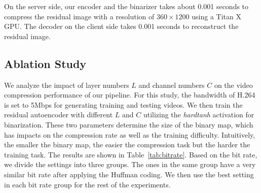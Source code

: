 \documentclass[letterpaper]{article} %
\begin{document}
	{} On the server side, our encoder and the binarizer takes about 0.001 seconds to compress the residual image with a resolution of $360 \times 1200$ using a Titan X GPU. The decoder on the client side takes 0.001 seconds to reconstruct the residual image. %

	\subsection{Ablation Study}

	{} We analyze the impact of layer numbers $L$ and channel numbers $C$ on the video compression performance of our pipeline. For this study, the bandwidth of H.264 is set to 5Mbps for generating training and testing videos. We then train the residual autoencoder with different $L$ and $C$ utilizing the \textit{hardtanh} activation for binarization. These two parameters determine the size of the binary map, which has impacts on the compression rate as well as the training difficulty. Intuitively, the smaller the binary map, the easier the compression task but the harder the training task. The results are shown in Table~\ref{tab:bitrate}. Based on the bit rate, we divide the settings into three groups. The ones in the same group have a very similar bit rate after applying the Huffman coding. We then use the best setting in each bit rate group for the rest of the experiments.
\end{document}

